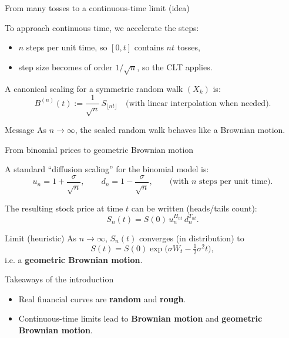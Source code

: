 \documentclass[10pt,aspectratio=169]{beamer}
\begin{document}
\begin{frame}{From many tosses to a continuous-time limit (idea)}

To approach continuous time, we accelerate the steps:\pause
\begin{itemize}
  \item \(n\) steps per unit time, so \([0,t]\) contains \(nt\) tosses, \pause
  \item step size becomes of order \(1/\sqrt{n}\), so the CLT applies. \pause
\end{itemize}

\medskip
A canonical scaling for a symmetric random walk \((X_k)\) is:\pause
\[
B^{(n)}(t) := \frac{1}{\sqrt{n}}\,S_{\lfloor nt\rfloor}
\quad
\text{(with linear interpolation when needed).}
\]
\pause

\begin{block}{Message}
As \(n\to\infty\), the scaled random walk behaves like a Brownian motion.
\end{block}

\end{frame}

\begin{frame}{From binomial prices to geometric Brownian motion}

A standard “diffusion scaling” for the binomial model is:\pause
\[
u_n = 1+\frac{\sigma}{\sqrt{n}},
\qquad
d_n = 1-\frac{\sigma}{\sqrt{n}},
\qquad
\text{(with \(n\) steps per unit time).}
\]
\pause

The resulting stock price at time \(t\) can be written (heads/tails count):\pause
\[
S_n(t) = S(0)\,u_n^{H_{nt}}\,d_n^{T_{nt}}.
\]
\pause

\begin{alertblock}{Limit (heuristic)}
As \(n\to\infty\), \(S_n(t)\) converges (in distribution) to
\[
S(t)=S(0)\exp\!\Big(\sigma W_t - \tfrac12\sigma^2 t\Big),
\]
i.e. a \textbf{geometric Brownian motion}.
\end{alertblock}

\end{frame}

\begin{frame}{Takeaways of the introduction}

\begin{itemize}
  \item Real financial curves are \textbf{random} and \textbf{rough}. \pause
  \item Continuous-time limits lead to \textbf{Brownian motion} and \textbf{geometric Brownian motion}.
\end{itemize}

\end{frame}
\end{document}
